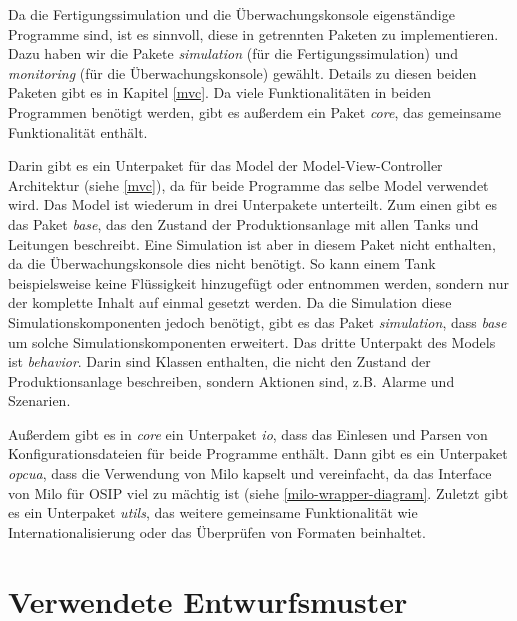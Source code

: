 \documentclass[parskip=full]{scrartcl}
\begin{document}
Da die Fertigungssimulation und die Überwachungskonsole eigenständige Programme sind, ist es sinnvoll, diese in getrennten Paketen zu
implementieren. Dazu haben wir die Pakete \emph{simulation} (für die Fertigungssimulation) und \emph{monitoring} (für die Überwachungskonsole)
gewählt. Details zu diesen beiden Paketen gibt es in Kapitel \ref{mvc}. Da viele Funktionalitäten in beiden Programmen
benötigt werden, gibt es außerdem ein Paket \emph{core}, das gemeinsame Funktionalität enthält.

Darin gibt es ein Unterpaket für das Model
der Model-View-Controller Architektur (siehe \ref{mvc}), da für beide Programme das selbe Model verwendet wird. Das Model ist wiederum in
drei Unterpakete unterteilt. Zum einen gibt es das Paket \emph{base}, das den Zustand der Produktionsanlage mit allen Tanks und Leitungen beschreibt.
Eine Simulation ist aber in diesem Paket nicht enthalten, da die Überwachungskonsole dies nicht benötigt. So kann einem Tank beispielsweise keine Flüssigkeit hinzugefügt oder entnommen werden,
sondern nur der komplette Inhalt auf einmal gesetzt werden. Da die Simulation diese Simulationskomponenten jedoch benötigt,
gibt es das Paket \emph{simulation}, dass \emph{base} um solche Simulationskomponenten erweitert. Das dritte Unterpakt des Models ist \emph{behavior}.
Darin sind Klassen enthalten, die nicht den Zustand der Produktionsanlage beschreiben, sondern Aktionen sind, z.B. Alarme und Szenarien.

Außerdem gibt es in \emph{core} ein Unterpaket \emph{io}, dass das Einlesen und Parsen von Konfigurationsdateien für beide Programme enthält. Dann gibt
es ein Unterpaket \emph{opcua}, dass die Verwendung von Milo kapselt und vereinfacht, da das Interface von Milo für OSIP viel zu mächtig
ist (siehe \ref{milo-wrapper-diagram}. Zuletzt gibt es ein Unterpaket \emph{utils}, das weitere gemeinsame Funktionalität wie Internationalisierung oder das Überprüfen von
Formaten beinhaltet.

\pagebreak
\section{Verwendete Entwurfsmuster}
\end{document}
